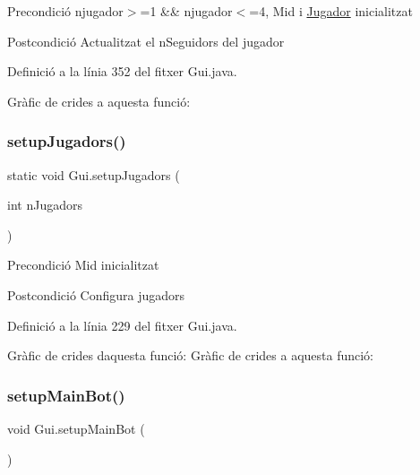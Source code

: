 \begin{DoxyPrecond}{Precondició}
njugador$>$=1 \&\& njugador$<$=4, Mid i \mbox{\hyperlink{class_jugador}{Jugador}} inicialitzat 
\end{DoxyPrecond}
\begin{DoxyPostcond}{Postcondició}
Actualitzat el n\+Seguidors del jugador 
\end{DoxyPostcond}


Definició a la línia 352 del fitxer Gui.\+java.

Gràfic de crides a aquesta funció\+:
\mbox{\label{class_gui_a122d77f189c0b53e90fbbb8810119996}} 
\subsubsection{\texorpdfstring{setup\+Jugadors()}{setupJugadors()}}
{\footnotesize\ttfamily static void Gui.\+setup\+Jugadors (\begin{DoxyParamCaption}\item[{int}]{n\+Jugadors }\end{DoxyParamCaption})\hspace{0.3cm}{\ttfamily [static]}}

\begin{DoxyPrecond}{Precondició}
Mid inicialitzat 
\end{DoxyPrecond}
\begin{DoxyPostcond}{Postcondició}
Configura jugadors 
\end{DoxyPostcond}


Definició a la línia 229 del fitxer Gui.\+java.

Gràfic de crides d\textquotesingle{}aquesta funció\+:
Gràfic de crides a aquesta funció\+:
\mbox{\label{class_gui_a53da74ae8290c1e419b6e5e4994acf0a}} 
\subsubsection{\texorpdfstring{setup\+Main\+Bot()}{setupMainBot()}}
{\footnotesize\ttfamily void Gui.\+setup\+Main\+Bot (\begin{DoxyParamCaption}{ }\end{DoxyParamCaption})\hspace{0.3cm}{\ttfamily [private]}}

